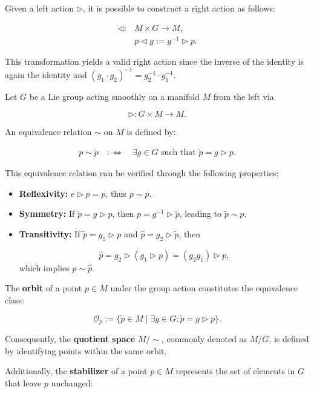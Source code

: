 Given a left action \(\triangleright\), it is possible to construct a right action as follows:

\begin{align*}
\triangleleft : &M \times G \longrightarrow M, \\
& p \triangleleft g := g^{-1} \triangleright p.
\end{align*}

This transformation yields a valid right action since the inverse of the identity is again the identity and $(g_1 \cdot g_2)^{-1} = g_2^{-1} \cdot g_1^{-1}$.

Let \(G\) be a Lie group acting smoothly on a manifold \(M\) from the left via

\[
\triangleright : G \times M \longrightarrow M.
\]

An equivalence relation \(\sim\) on \(M\) is defined by:

\begin{align*}
p \sim \tilde{p} \quad :\Longleftrightarrow \quad \exists g \in G \text{ such that } \tilde{p} = g \triangleright p.
\end{align*}

This equivalence relation can be verified through the following properties:

\begin{itemize}
  \item \textbf{Reflexivity:} \(e \triangleright p = p\), thus \(p \sim p\).
  \item \textbf{Symmetry:} If \(\tilde{p} = g \triangleright p\), then \(p = g^{-1} \triangleright \tilde{p}\), leading to \(\tilde{p} \sim p\).
  \item \textbf{Transitivity:} If \(\tilde{p} = g_1 \triangleright p\) and \(\hat{p} = g_2 \triangleright \tilde{p}\), then

\[
\hat{p} = g_2 \triangleright (g_1 \triangleright p) = (g_2 g_1) \triangleright p,
\]
which implies \(p \sim \hat{p}\).
\end{itemize}

The \textbf{orbit} of a point \(p \in M\) under the group action constitutes the equivalence class:

\[
\mathcal{O}_p := \{ \tilde{p} \in M \mid \exists g \in G : \tilde{p} = g \triangleright p \}.
\]

Consequently, the \textbf{quotient space} \(M/\!\sim\), commonly denoted as \(M/G\), is defined by identifying points within the same orbit.

Additionally, the \textbf{stabilizer} of a point \(p \in M\) represents the set of elements in \(G\) that leave \(p\) unchanged:

